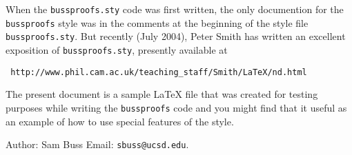 \documentclass[12pt]{article}
\begin{document}
\thispagestyle{empty}

When the {\tt bussproofs.sty} code was first written, the
only documention for the {\tt bussproofs} style was in the
comments at the beginning of the style file {\tt bussproofs.sty}.
But recently (July 2004), Peter Smith has written an excellent
exposition of {\tt bussproofs.sty}, presently available
at
\begin{center}
\tt
http://www.phil.cam.ac.uk/teaching\_staff/Smith/LaTeX/nd.html
\end{center}

The present document is
a sample \LaTeX{} file that was created for testing
purposes while writing the {\tt bussproofs} code and you might
find that it useful as an example of how to
use special features of the style.

Author: Sam Buss \hspace*{1in} Email: {\tt sbuss@ucsd.edu}.
\vspace*{0.25in}
\end{document}
